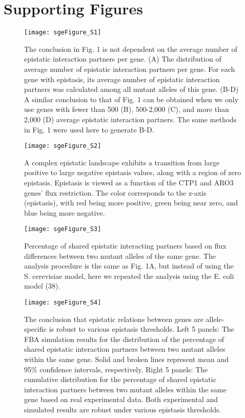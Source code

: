 \section{Supporting Figures}

\begin{figure}[!htb]
\centering
  \texttt{[image: sgeFigure\_S1]}
\caption{The conclusion in Fig. 1 is not dependent on the average
number of epistatic interaction partners per gene. (A) The
distribution of average number of epistatic interaction partners per
gene. For each gene with epistasis, its average number of epistatic
interaction partners was calculated among all mutant alleles of this
gene. (B-D) A similar conclusion to that of Fig. 1 can be obtained
when we only use genes with fewer than 500 (B), 500-2,000 (C), and
more than 2,000 (D) average epistatic interaction partners. The same
methods in Fig. 1 were used here to generate B-D.}
\label{fig:sgeS1}
\end{figure}

\begin{figure}[!htb]
\centering
  \texttt{[image: sgeFigure\_S2]}
\caption{A complex epistatic landscape exhibits a transition from
large positive to large negative epistasis values, along with a region
of zero epistasis. Epistasis is viewed as a function of the CTP1 and
ARO3 genes’ flux restriction. The color corresponds to the z-axis
(epistasis), with red being more positive, green being near zero, and
blue being more negative.}
\label{fig:sgeS2}
\end{figure}

\begin{figure}[!htb]
\centering
  \texttt{[image: sgeFigure\_S3]}
\caption{Percentage of shared epistatic interacting partners based on
flux differences between two mutant alleles of the same gene. The
analysis procedure is the same as Fig. 1A, but instead of using the
S. cerevisiae model, here we repeated the analysis using the E. coli
model (38).}
\label{fig:sgeS3}
\end{figure}

\begin{figure}[!htb]
\centering
  \texttt{[image: sgeFigure\_S4]}
  \caption{The conclusion that epistatic relations between genes are
allele-specific is robust to various epistasis thresholds. Left 5
panels: The FBA simulation results for the distribution of the
percentage of shared epistatic interaction partners between two mutant
alleles within the same gene. Solid and broken lines represent mean
and 95\% confidence intervals, respectively. Right 5 panels: The
cumulative distribution for the percentage of shared epistatic
interaction partners between two mutant alleles within the same gene
based on real experimental data. Both experimental and simulated
results are robust under various epistasis thresholds.}
\label{fig:sgeS4}

\end{figure}

